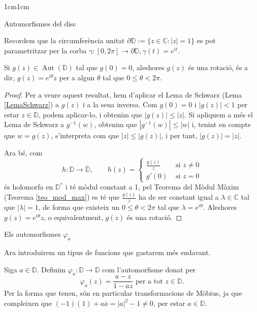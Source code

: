 \begin{adjustwidth}{1cm}{1cm}
\begin{subsection}{Automorfismes del disc}
\begin{nota}
    Recordem que la circumferència unitat $\partial\mathbb{D}:=\{z\in \mathbb{C}: |z|=1\}$ es pot parametritzar per la corba $\gamma: [0,2\pi] \to \partial\mathbb{D}, \gamma(t)=e^{it}$. 
\end{nota}

\begin{lema}
    Si $g(z)\in\operatorname{Aut}(\mathbb{D})$ tal que $g(0)=0$, aleshores $g(z)$ és una rotació, és a dir, $g(z)=e^{i\theta}z$ per a algun $\theta$ tal que $0\leq\theta< 2\pi$.
    \label{rotacio}
\end{lema}

\begin{proof}
    Per a veure aquest resultat, hem d'aplicar el Lema de Schwarz (Lema \ref{LemaSchwarz}) a $g(z)$ i a la seua inversa. Com $g(0)=0$ i $|g(z)|<1$ per estar $z\in\mathbb{D}$, podem aplicar-lo, i obtenim que $|g(z)|\leq|z|$. Si apliquem a més el Lema de Schwarz a $g^{-1}(w)$, obtenim que $|g^{-1}(w)|\leq|w|$ i, tenint en compte que $w=g(z)$, s'interpreta com que $|z|\leq|g(z)|$, i per tant, $|g(z)|=|z|$. 
    
    Ara bé, com
    \[
        h:\mathbb{D}\to \overline{\mathbb{D}}, \qquad h(z)= 
        \begin{cases}
            \frac{g(z)}{z} &\text{ si } z\neq 0 \\
            g'(0) &\text{ si } z=0
        \end{cases}
    \]
    és holomorfa en $\mathbb{D}^*$ i té mòdul constant a 1, pel Teorema del Mòdul Màxim (Teorema \ref{teo_mod_max}) es té que $\frac{g(z)}{z}$ ha de ser constant igual a $\lambda\in \mathbb{C}$ tal que $|\lambda|=1$, de forma que existeix un $0\leq\theta< 2\pi$ tal que $\lambda=e^{i\theta}$. Aleshores $g(z)=e^{i\theta} z$, o equivalentment, $g(z)$ és una rotació.
\end{proof}

\end{subsection}

\begin{subsection}{Els automorfismes \texorpdfstring{$\varphi_a$}{C}}

Ara introduirem un tipus de funcions que gastarem més endavant.

\begin{definicio}
    Siga $a\in \mathbb{D}$. Definim $\varphi_a:\mathbb{D}\to \mathbb{D}$ com l'automorfisme donat per 
    \[
        \varphi_a(z)=\frac{a-z}{1-\overline{a}z} \text{ per a tot } z\in \mathbb{D}.
    \]
    Per la forma que tenen, són en particular transformacions de Möbius, ja que compleixen que $(-1)(1)+a\overline{a}=|a|^2-1\neq 0$, per estar $a\in \mathbb{D}$.
    \label{varphi_a}
\end{definicio}


\end{subsection}
\end{adjustwidth}
